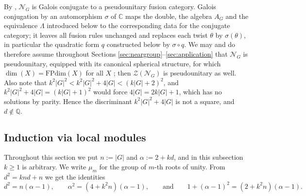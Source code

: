 \documentclass[10pt]{article}
\theoremstyle{plain}
\theoremstyle{definition}
\theoremstyle{plain}
\begin{document}
\par By \cite[Lemma 3.1]{MR4655273}, $\mathcal{N}_G$ is Galois conjugate to a pseudounitary fusion category. Galois conjugation by an automorphism $\sigma$ of $\mathbb{C}$ maps the double, the algebra $A_G$ and the equivalence $\Lambda$ introduced below to the corresponding data for the conjugate category; it leaves all fusion rules unchanged and replaces each twist $\theta$ by $\sigma(\theta)$, in particular the quadratic form $q$ constructed below by $\sigma\circ q$. We may and do therefore assume throughout Sections \ref{sec:neargroup}--\ref{sec:application} that $\mathcal{N}_G$ is pseudounitary, equipped with its canonical spherical structure, for which $\dim(X)=\mathrm{FPdim}(X)$ for all $X$ \cite[Proposition 9.5.1]{MR3242743}; then $\mathcal{Z}(\mathcal{N}_G)$ is pseudounitary as well. Also note that $k^2|G|^2<k^2|G|^2+4|G|<(k|G|+2)^2$, and $k^2|G|^2+4|G|=(k|G|+1)^2$ would force $4|G|=2k|G|+1$, which has no solutions by parity. Hence the discriminant $k^2|G|^2+4|G|$ is not a square, and $d\notin\mathbb{Q}$.


\subsection{Induction via local modules}\label{subsec:localpt}

Throughout this section we put $n:=|G|$ and $\alpha:=2+kd$, and in this subsection $k\geq1$ is arbitrary. We write $\mu_m$ for the group of $m$-th roots of unity. From $d^2=knd+n$ we get the identities
\begin{equation}\label{eq:ids}
  d^{2}=n(\alpha-1),\qquad
  \alpha^{2}=(4+k^2n)(\alpha-1),\qquad\text{and}\qquad
  1+(\alpha-1)^{2}=(2+k^{2}n)(\alpha-1).
\end{equation}
\end{document}
